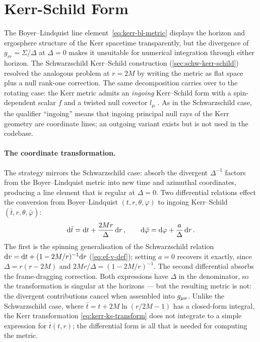 \section{Kerr-Schild Form}
\label{sec:kerr-ks}

The Boyer--Lindquist line element~\eqref{eq:kerr-bl-metric} displays
the horizon and ergosphere structure of the Kerr spacetime
transparently, but the divergence of $g_{rr} = \Sigma/\Delta$ at
$\Delta = 0$ makes it unsuitable for numerical integration through
either horizon.  The Schwarzschild Kerr--Schild construction
(\cref{sec:schw-kerr-schild}) resolved the analogous problem at
$r = 2M$ by writing the metric as flat space plus a null rank-one
correction.  The same decomposition carries over to the rotating case:
the Kerr metric admits an \emph{ingoing} Kerr--Schild form with a
spin-dependent scalar $f$ and a twisted null covector $l_\mu$
\cite{KerrSchild1965,Visser2007}.  As in the Schwarzschild case, the
qualifier ``ingoing'' means that ingoing principal null rays of the
Kerr geometry are coordinate lines; an outgoing variant exists but is
not used in the codebase.

\paragraph{The coordinate transformation.}

The strategy mirrors the Schwarzschild case: absorb the divergent
$\Delta^{-1}$ factors from the Boyer--Lindquist metric into new time
and azimuthal coordinates, producing a line element that is regular at
$\Delta = 0$.  Two differential relations effect the conversion from
Boyer--Lindquist $(t, r, \theta, \varphi)$ to ingoing Kerr--Schild
$(\bar{t}, r, \theta, \bar{\varphi})$:
%
\begin{equation}
  \mathrm{d}\bar{t} = \mathrm{d} t + \frac{2Mr}{\Delta}\,\mathrm{d} r \,,
  \qquad
  \mathrm{d}\bar{\varphi} = \mathrm{d}\varphi + \frac{a}{\Delta}\,\mathrm{d} r \,.
  \label{eq:kerr-ks-transform}
\end{equation}
%
The first is the spinning generalisation of the Schwarzschild relation
$\mathrm{d} v = \mathrm{d} t + (1-2M/r)^{-1}\mathrm{d} r$ (\cref{eq:ef-v-def}); setting
$a = 0$ recovers it exactly, since $\Delta = r(r-2M)$ and
$2Mr/\Delta = (1 - 2M/r)^{-1}$.  The second differential absorbs the
frame-dragging correction.  Both expressions have $\Delta$ in the
denominator, so the transformation is singular at the horizons --- but
the resulting metric is not: the divergent contributions cancel when
assembled into $g_{\mu\nu}$.  Unlike the Schwarzschild case, where
$\bar{t} = t + 2M\ln(r/2M - 1)$ has a closed-form integral, the Kerr
transformation \eqref{eq:kerr-ks-transform} does not integrate to a
simple expression for $\bar{t}(t,r)$; the differential form is all
that is needed for computing the metric.

